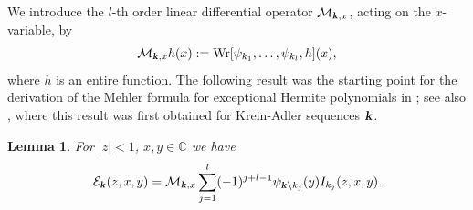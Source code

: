 \documentclass[12pt]{article}
\def\E{{\mathcal E}}
\def\wr{\textnormal{Wr}}
\def\c{{\mathbb C}}
\def\k{\textbf{\textsl{k}}}
\newtheorem{lemma}{Lemma}
\begin{document}
We introduce the $l$-th order linear differential operator 
${\mathcal M}_{\k,x}$, acting on the $x$-variable, by
\begin{equation}\label{def_M_kx}
{\mathcal M}_{\k,x} h(x):=\wr[ \psi_{k_1},\dots,\psi_{k_l},h](x), 
\end{equation}
where $h$ is an entire function. The following result was the starting point for the derivation of the Mehler formula for exceptional Hermite polynomials in  \cite{Pupasov_2015}; see also \cite{Pupasov_2007}, where this result was first obtained for Krein-Adler sequences $\k$.   



\begin{lemma}\label{lemma5}
For $|z|<1$, $x,y\in \c$  we have
\begin{equation}\label{eqn_PM}
\E_{\k}(z,x,y)=  
{\mathcal M}_{\k,x} \sum\limits_{j=1}^l (-1)^{j+l-1} \psi_{\k \setminus k_j}(y)  I_{k_j}(z,x,y).
\end{equation}
\end{lemma}
\end{document}
